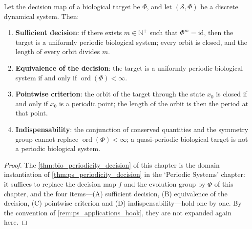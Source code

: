 \begin{theorem}\label{thm:bio_periodicity_decision}
Let the decision map of a biological target be $\Phi$, and let $(\mathcal S,\Phi)$ be a discrete dynamical system. Then:
\begin{enumerate}[label=(\Alph*)]
    \item \textbf{Sufficient decision}: if there exists $m\in\mathbb N^+$ such that $\Phi^m=\mathrm{id}$, then the target is a uniformly periodic biological system; every orbit is closed, and the length of every orbit divides $m$.
    \item \textbf{Equivalence of the decision}: the target is a uniformly periodic biological system if and only if $\operatorname{ord}(\Phi)<\infty$.
    \item \textbf{Pointwise criterion}: the orbit of the target through the state $x_0$ is closed if and only if $x_0$ is a periodic point; the length of the orbit is then the period at that point.
    \item \textbf{Indispensability}: the conjunction of conserved quantities and the symmetry group cannot replace $\operatorname{ord}(\Phi)<\infty$; a quasi-periodic biological target is not a periodic biological system.
\end{enumerate}
\end{theorem}

\begin{proof}
The \cref{thm:bio_periodicity_decision} of this chapter is the domain instantiation of \cref{thm:ps_periodicity_decision} in the `Periodic Systems' chapter:
it suffices to replace the decision map $f$ and the evolution group by $\Phi$ of this chapter, and the four items---(A) sufficient decision, (B) equivalence of the decision, (C) pointwise criterion and
(D) indispensability---hold one by one. By the convention of \cref{rem:ps_applications_hook}, they are not expanded again here.
\end{proof}

